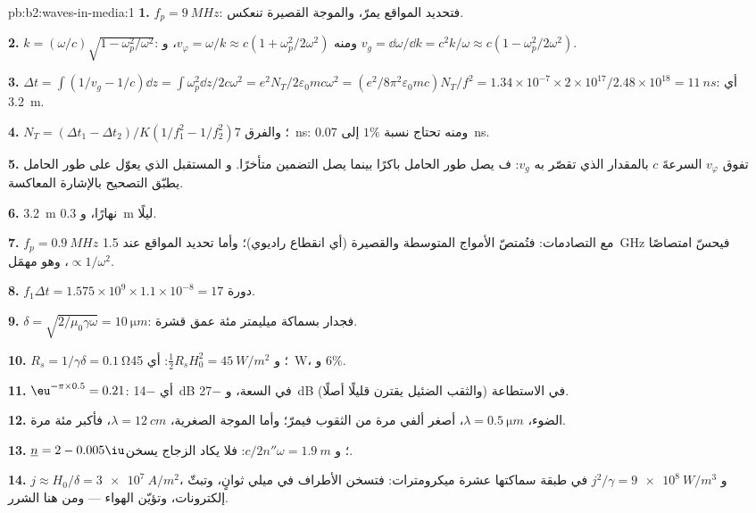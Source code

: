 \begin{solution}{pb:b2:waves-in-media:1}
\textbf{1.} $f_p = \qty{9}{MHz}$: فتحديد المواقع يمرّ، والموجة القصيرة تنعكس.

\textbf{2.} $k = (\omega/c)\sqrt{1 - \omega_p^2/\omega^2}$: ومنه $v_\varphi = \omega/k \approx c(1 + \omega_p^2/
2\omega^2)$، و $v_g = \dd\omega/\dd k = c^2k/\omega \approx c(1 - \omega_p^2/2\omega^2)$.

\textbf{3.} $\Delta t = \int(1/v_g - 1/c)\dd z = \int\omega_p^2\dd z/2c\omega^2 = e^2N_T/2\varepsilon_0
mc\omega^2 = (e^2/8\pi^2\varepsilon_0mc)N_T/f^2 = 1.34 \times 10^{-7} \times 2 \times 10^{17}/2.48 \times
10^{18} = \qty{11}{ns}$: أي \qty{3.2}{m}.

\textbf{4.} $N_T = (\Delta t_1 - \Delta t_2)/K(1/f_1^2 - 1/f_2^2)$؛ والفرق
\qty{7}{ns}: ومنه تحتاج نسبة $1\%$ إلى \qty{0.07}{ns}.

\textbf{5.} تفوق $v_\varphi$ السرعةَ $c$ بالمقدار الذي تقصّر به $v_g$: ف
يصل طور الحامل باكرًا بينما يصل التضمين متأخرًا. و
المستقبل الذي يعوّل على طور الحامل يطبّق التصحيح بالإشارة المعاكسة.

\textbf{6.} \qty{3.2}{m} نهارًا، و \qty{0.3}{m} ليلًا.

\textbf{7.} $f_p = \qty{0.9}{MHz}$ مع التصادمات: فتُمتصّ الأمواج المتوسطة والقصيرة
(أي انقطاع راديوي)؛ وأما تحديد المواقع عند \qty{1.5}{GHz} فيحسّ امتصاصًا
$\propto 1/\omega^2$، وهو مهمَل.

\textbf{8.} $f_1\Delta t = 1.575 \times 10^9 \times 1.1 \times 10^{-8} = 17$ دورة.

\textbf{9.} $\delta = \sqrt{2/\mu_0\gamma\omega} = \qty{10}{\micro m}$: فجدار بسماكة ميليمتر
مئة عمق قشرة.

\textbf{10.} $R_s = 1/\gamma\delta = \qty{0.1}{\ohm}$؛ و $\tfrac12R_sH_0^2 = \qty{45}{W/m^2}$: أي \qty{45}{W}،
و $6\%$.

\textbf{11.} $\eu^{-\pi \times 0.5} = 0.21$: أي \qty{-14}{dB} في السعة، و \qty{-27}{dB} في
الاستطاعة (والثقب الضئيل يقترن قليلًا أصلًا).

\textbf{12.} الضوء، $\lambda = \qty{0.5}{\micro m}$، أصغر ألفي مرة
من الثقوب فيمرّ؛ وأما الموجة الصغرية، $\lambda = \qty{12}{cm}$، فأكبر
مئة مرة.

\textbf{13.} $\underline n = 2 - 0.005\iu$؛ و $c/2n''\omega = \qty{1.9}{m}$: فلا يكاد الزجاج
يسخن.

\textbf{14.} $j \approx H_0/\delta = \qty{3e7}{A/m^2}$، و $j^2/\gamma = \qty{9e8}{W/m^3}$ في طبقة
سماكتها عشرة ميكرومترات: فتسخن الأطراف في ميلي ثوانٍ، وتبثّ إلكترونات،
وتؤيّن الهواء --- ومن هنا الشرر.


\end{solution}
